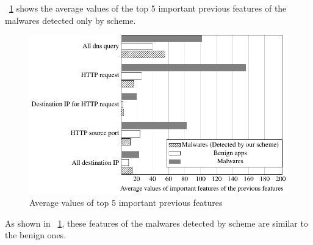 \figurename~\ref{fig:important_prev_feature} shows the average values of the top 5 important previous features of the malwares detected only by \our scheme.
\begin{figure}[p]
	\includegraphics[scale=1.0, bb=10 10 250 250]{./figures/important_prev_f_tikz.pdf}
  \caption{Average values of top 5 important previous features} 
  \label{fig:important_prev_feature}
\end{figure}

As shown in \figurename~\ref{fig:important_prev_feature}, these features of the malwares detected by \our scheme are similar to the benign ones.
\afterpage{\clearpage}
\newpage


\afterpage{\clearpage}
\newpage


